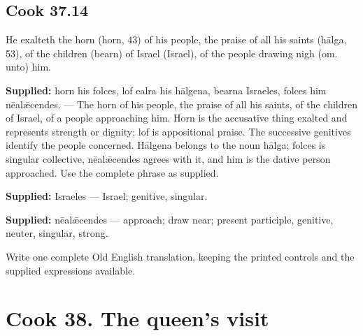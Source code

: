 \par\begin{minipage}{\linewidth}\raggedright
\subsection*{Cook 37.14}

He exalteth the horn (horn, 43) of his people, the praise of all his saints (hālga, 53), of the children (bearn) of Israel (Israel), of the people drawing nigh (om. unto) him.

\end{minipage}\par\addvspace{4pt}

\textbf{Supplied:} horn his folces, lof ealra his hālgena, bearna Israeles, folces him nēalǣcendes. — The horn of his people, the praise of all his saints, of the children of Israel, of a people approaching him. Horn is the accusative thing exalted and represents strength or dignity; lof is appositional praise. The successive genitives identify the people concerned. Hālgena belongs to the noun hālga; folces is singular collective, nēalǣcendes agrees with it, and him is the dative person approached. Use the complete phrase as supplied.

\textbf{Supplied:} Israeles — Israel; genitive, singular.

\textbf{Supplied:} nēalǣcendes — approach; draw near; present participle, genitive, neuter, singular, strong.

Write one complete Old English translation, keeping the printed controls and the supplied expressions available.

\section*{Cook 38. The queen’s visit}


